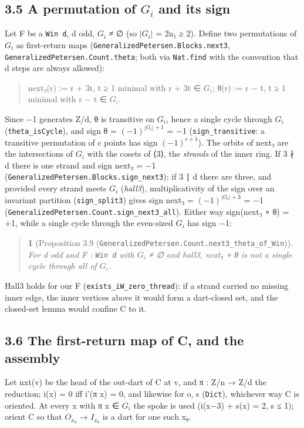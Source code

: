 \documentclass[11pt,a4paper]{article}
\theoremstyle{named}
\newtheorem*{namedthm}{}
\begin{document}
\subsection*{3.5 A permutation of $G_i$ and its sign}
Let F be a \texttt{Win\ \allowbreak{}d}, d odd, $G_i$ ≠ ∅ (so $|G_i|$ = 2n₁ ≥ 2). Define two permutations of $G_i$ as first-return maps (\texttt{GeneralizedPetersen.\allowbreak{}Blocks.\allowbreak{}next3}, \texttt{GeneralizedPetersen.\allowbreak{}Count.\allowbreak{}theta}; both via \texttt{Nat.\allowbreak{}find} with the convention that d steps are always allowed):

\begin{quote}
next₃(r) := r + 3t, t ≥ 1 minimal with r + 3t ∈ $G_i$;  θ(r) := r − t, t ≥ 1 minimal with r − t ∈ $G_i$.
\end{quote}
Since −1 generates Z/d, θ is transitive on $G_i$, hence a single cycle through $G_i$ (\texttt{theta\_\allowbreak{}isCycle}), and sign θ = $(−1)^{|G_i|+1}$ = −1 (\texttt{sign\_\allowbreak{}transitive}: a transitive permutation of c points has sign $(−1)^{c+1}$). The orbits of next₃ are the intersections of $G_i$ with the cosets of ⟨3⟩, the \textit{strands} of the inner ring. If 3 ∤ d there is one strand and sign next₃ = −1 (\texttt{GeneralizedPetersen.\allowbreak{}Blocks.\allowbreak{}sign\_\allowbreak{}next3}); if 3 ∣ d there are three, and provided every strand meets $G_i$ (\textit{hall3}), multiplicativity of the sign over an invariant partition (\texttt{sign\_\allowbreak{}split3}) gives sign next₃ = $(−1)^{|G_i|+3}$ = −1 (\texttt{GeneralizedPetersen.\allowbreak{}Count.\allowbreak{}sign\_\allowbreak{}next3\_\allowbreak{}all}). Either way sign(next₃ ∘ θ) = +1, while a single cycle through the even-sized $G_i$ has sign −1:

\begin{quote}
\begin{namedthm}[Proposition 3.9 (\texttt{GeneralizedPetersen.\allowbreak{}Count.\allowbreak{}next3\_\allowbreak{}theta\_\allowbreak{}of\_\allowbreak{}Win})]
For d odd and F : \texttt{Win\ \allowbreak{}d} with $G_i$ ≠ ∅ and hall3, next₃ ∘ θ is not a single cycle through all of $G_i$.
\end{namedthm}
\end{quote}
Hall3 holds for our F (\texttt{exists\_\allowbreak{}iW\_\allowbreak{}zero\_\allowbreak{}thread}): if a strand carried no missing inner edge, the inner vertices above it would form a dart-closed set, and the closed-set lemma would confine C to it.

\subsection*{3.6 The first-return map of C, and the assembly}
Let nxt(v) be the head of the out-dart of C at v, and π : Z/n → Z/d the reduction; i(x) = 0 iff i'(π x) = 0, and likewise for o, s (\texttt{Dict}), whichever way C is oriented. At every x with π x ∈ $G_i$ the spoke is used (\textbar{}i(x−3)\textbar{} + \textbar{}s(x)\textbar{} = 2, \textbar{}s\textbar{} ≤ 1); orient C so that $O_{x₀}$ → $I_{x₀}$ is a dart for one such x₀.
\end{document}
